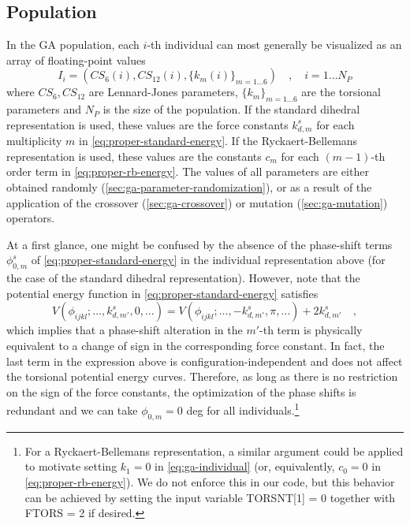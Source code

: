 \documentclass[10pt,a4paper]{report}
\numberwithin{equation}{section}
\begin{document}
\subsection{Population}
\label{sec:ga-population}

In the GA population, each $i$-th individual can most generally be visualized as an
array of floating-point values
\begin{equation}
  \label{eq:ga-individual}
  I_i = (CS_6(i), CS_{12}(i), \{k_m(i)\}_{m=1\ldots 6}) \quad , \quad i = 1 \ldots N_P
\end{equation}
where $CS_6, CS_{12}$ are Lennard-Jones parameters, $\{k_m\}_{m=1\ldots 6}$ are the torsional parameters and $N_P$ is the size of the population.
If the standard dihedral representation is used, these values are the force constants $k_{d,m}^s$ for each multiplicity $m$ in \autoref{eq:proper-standard-energy}.
If the Ryckaert-Bellemans representation is used, these values are the constants $c_m$  for each $(m-1)$-th order term in \autoref{eq:proper-rb-energy}.
The values of all parameters are either obtained randomly (\autoref{sec:ga-parameter-randomization}), or as a result of the application of the crossover (\autoref{sec:ga-crossover}) or mutation (\autoref{sec:ga-mutation}) operators.

At a first glance, one might be confused by the absence of the phase-shift terms $\phi_{0,m}^s$ of \autoref{eq:proper-standard-energy} in the individual representation above (for the case of the standard dihedral representation).
However, note that the potential energy function in \autoref{eq:proper-standard-energy} satisfies
\begin{equation*}
  V(\phi_{ijkl}; \ldots,k_{d,m'}^s,0,\ldots) = V(\phi_{ijkl}; \ldots,-k_{d,m'}^s,\pi,\ldots) + 2k_{d,m'}^s\quad , 
\end{equation*}
which implies that a phase-shift alteration in the $m'$-th term is physically equivalent to a change of sign in the corresponding force constant.
In fact, the last term in the expression above is configuration-independent and does not affect the torsional potential energy curves.
Therefore, as long as there is no restriction on the sign of the force constants, the optimization of the phase shifts is redundant and we can take $\phi_{0,m} = 0$ deg for all individuals.\footnote{For a Ryckaert-Bellemans representation, a similar argument could be applied to motivate setting $k_1 = 0$ in \autoref{eq:ga-individual} (or, equivalently, $c_0 = 0$ in \autoref{eq:proper-rb-energy}).
  We do not enforce this in our code, but this behavior can be achieved by setting the input variable TORSNT[1] = 0 together with FTORS = 2 if desired.}
\end{document}
